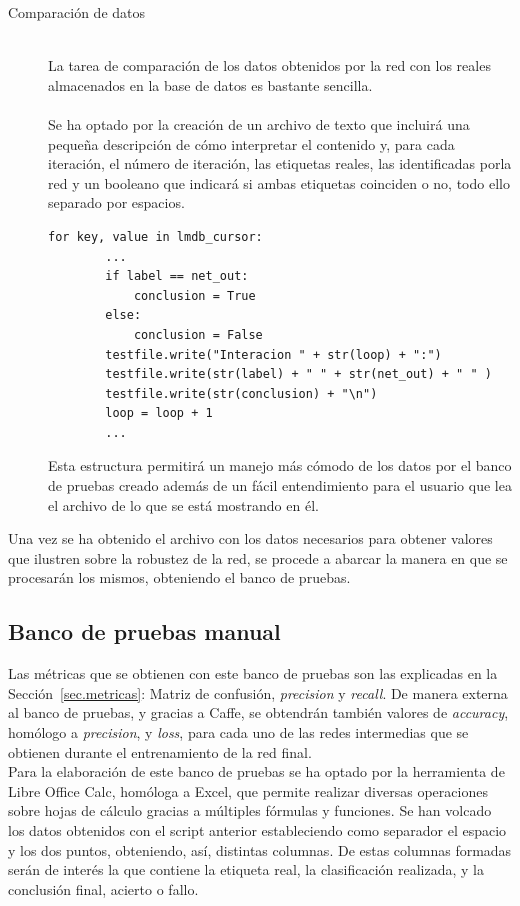 \begin{description}
	\item[Comparación de datos] \hfill 
	\vspace{10pt}
	\\
	La tarea de comparación de los datos obtenidos por la red con los reales almacenados en la base de datos es bastante sencilla. \\
	\vspace{-10pt}
	\\
	Se ha optado por la creación de un archivo de texto que incluirá una pequeña descripción de cómo interpretar el contenido y, para cada iteración, el número de iteración, las etiquetas reales, las identificadas porla red y un booleano que indicará si ambas etiquetas coinciden o no, todo ello separado por espacios.
	\vspace{10pt}
	\begin{lstlisting}[frame=single]
	for key, value in lmdb_cursor:
		...
		if label == net_out:
			conclusion = True
		else:
			conclusion = False
		testfile.write("Interacion " + str(loop) + ":")
		testfile.write(str(label) + " " + str(net_out) + " " )
		testfile.write(str(conclusion) + "\n")
		loop = loop + 1
		...
	\end{lstlisting}
	Esta estructura permitirá un manejo más cómodo de los datos por el banco de pruebas creado además de un fácil entendimiento para el usuario que lea el archivo de lo que se está mostrando en él.\\
\end{description}
Una vez se ha obtenido el archivo con los datos necesarios para obtener valores que ilustren sobre la robustez de la red, se procede a abarcar la manera en que se procesarán los mismos, obteniendo el banco de pruebas.

\subsection{Banco de pruebas manual}
Las métricas que se obtienen con este banco de pruebas son las explicadas en la Sección~\ref{sec.metricas}: Matriz de confusión, \textit{precision} y \textit{recall}. De manera externa al banco de pruebas, y gracias a Caffe, se obtendrán también valores de \textit{accuracy}, homólogo a \textit{precision}, y \textit{loss}, para cada uno de las redes intermedias que se obtienen durante el entrenamiento de la red final.\\

Para la elaboración de este banco de pruebas se ha optado por la herramienta de Libre Office Calc, homóloga a Excel, que permite realizar diversas operaciones sobre hojas de cálculo gracias a múltiples fórmulas y funciones. Se han volcado los datos obtenidos con el script anterior estableciendo como separador el espacio y los dos puntos, obteniendo, así, distintas columnas. De estas columnas formadas serán de interés la que contiene la etiqueta real, la clasificación realizada, y la conclusión final, acierto o fallo.\\

